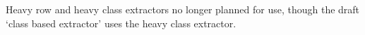 
Heavy row and heavy class extractors no longer planned for use, though the draft `class based extractor' uses the heavy class extractor.
